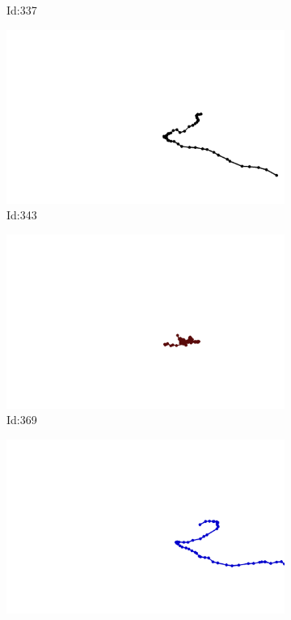 \documentclass[12pt,twoside]{report}
\begin{document}
\begin{figure}
\begin{subfigure}[b]{0.20\textwidth}
\caption{Id:337}
\end{subfigure}
\begin{subfigure}[b]{0.20\textwidth}
\centering
\includegraphics[width=\textwidth]{../trajectories/343.png}
\caption{Id:343}
\end{subfigure}
\begin{subfigure}[b]{0.20\textwidth}
\centering
\includegraphics[width=\textwidth]{../trajectories/369.png}
\caption{Id:369}
\end{subfigure}
\begin{subfigure}[b]{0.20\textwidth}
\centering
\includegraphics[width=\textwidth]{../trajectories/382.png}

\end{subfigure}
\end{figure}
\end{document}

